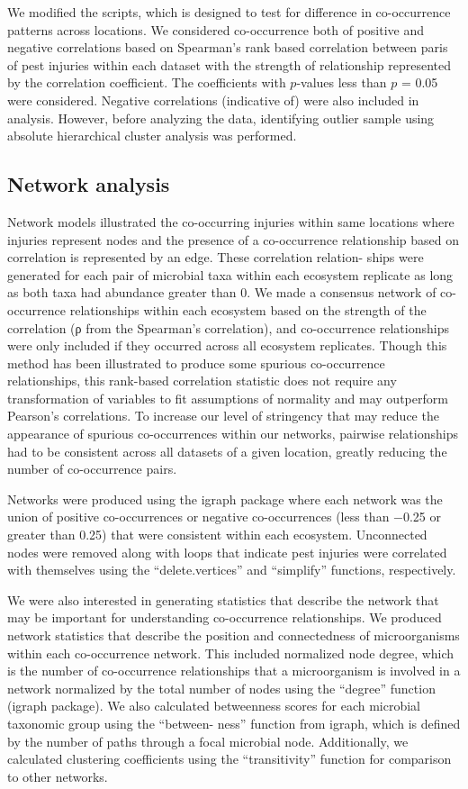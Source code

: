 \documentclass{frontiersSCNS} %
\begin{document}
We modified the scripts, which is designed to test for difference in co-occurrence patterns across locations.  We considered co-occurrence both of positive and negative correlations based on Spearman's rank based correlation between paris of pest injuries within each dataset with the strength of relationship represented by the correlation coefficient. The coefficients with $p$-values less than $p$ = 0.05 were considered. Negative correlations (indicative of) were also included in analysis. However, before analyzing the data, identifying  outlier sample using absolute hierarchical cluster analysis was performed.


\subsection{Network analysis}

Network models illustrated the co-occurring injuries within same locations  where injuries represent nodes and the presence of a co-occurrence relationship based on correlation is represented by an edge. These correlation relation- ships were generated for each pair of microbial taxa within each ecosystem replicate as long as both taxa had abundance greater than 0. We made a consensus network of co-occurrence relationships within each ecosystem based on the strength of the correlation (ρ from the Spearman’s correlation), and co-occurrence relationships were only included if they occurred across all ecosystem replicates. Though this method has been illustrated to produce some spurious co-occurrence relationships, this rank-based correlation statistic does not require any transformation of variables to fit assumptions of normality and may outperform Pearson’s correlations. To increase our level of stringency that may reduce the appearance of spurious co-occurrences within our networks, pairwise relationships had to be consistent across all datasets of a given location, greatly reducing the number of co-occurrence pairs.

Networks were produced using the igraph package where each network was the union of positive co-occurrences or negative co-occurrences (less than −0.25 or greater than 0.25) that were consistent within each ecosystem. Unconnected nodes were removed along with loops that indicate pest injuries  were correlated with themselves using the “delete.vertices” and “simplify” functions, respectively.


We were also interested in generating statistics that describe the network that may be important for understanding co-occurrence relationships. We produced network statistics that describe the position and connectedness of microorganisms within each co-occurrence network. This included normalized node degree, which is the number of co-occurrence relationships that a microorganism is involved in a network normalized by the total number of nodes using the “degree” function (igraph package). We also calculated betweenness scores for each microbial taxonomic group using the “between- ness” function from igraph, which is defined by the number of paths through a focal microbial node. Additionally, we calculated clustering coefficients using the “transitivity” function for comparison to other networks.
\end{document}
